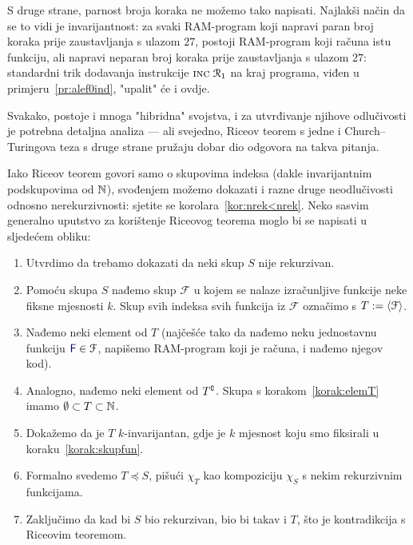 S druge strane, parnost broja koraka ne možemo tako napisati. Najlakši način da se to vidi je invarijantnost: za svaki RAM-program koji napravi paran broj koraka prije zaustavljanja s ulazom $27$, postoji RAM-program koji računa istu funkciju, ali napravi neparan broj koraka prije zaustavljanja s ulazom $27$: standardni trik dodavanja instrukcije $\textsc{inc}\;\mathcal R_{1}$ na kraj programa, viđen u primjeru~\ref{pr:alef0ind}, "upalit" će i ovdje.

Svakako, postoje i mnoga "hibridna" svojstva, i za utvrđivanje njihove odlučivosti je potrebna detaljna analiza --- ali svejedno, Riceov teorem s jedne i Church--\!Turingova teza s druge strane pružaju dobar dio odgovora na takva pitanja.

Iako Riceov teorem govori samo o skupovima indeksa (dakle invarijantnim podskupovima od ${\mathbb N}$), svođenjem možemo dokazati i razne druge neodlučivosti odnosno nerekurzivnosti: sjetite se korolara~\ref{kor:nrek<nrek}. Neko sasvim generalno uputstvo za korištenje Riceovog teorema moglo bi se napisati u sljedećem obliku:

\begin{enumerate}
    \item Utvrdimo da trebamo dokazati da neki skup $S$ nije rekurzivan.
    \item\label{korak:skupfun} Pomoću skupa $S$ nađemo skup $\mathcal F$ u kojem se nalaze izračunljive funkcije neke fiksne mjesnosti $k$.
    Skup svih indeksa svih funkcija iz $\mathcal F$ označimo s $T:=\langle\mathcal F\rangle$.
    \item\label{korak:elemT} Nađemo neki element od $T$ (najčešće tako da nađemo neku jednostavnu funkciju $\f F\in\mathcal F$, napišemo RAM-program koji je računa, i nađemo njegov kod).
    \item Analogno, nađemo neki element od $T\sp{{\scriptscriptstyle\complement}}$. Skupa s korakom~\ref{korak:elemT} imamo $\emptyset\subset T\subset{\mathbb N}$.
    \item Dokažemo da je $T$ $k$-invarijantan, gdje je $k$ mjesnost koju smo fiksirali u koraku~\ref{korak:skupfun}.
    \item Formalno svedemo $T\!\preceq S$, pišući $\chi_T$ kao kompoziciju $\chi_S$ s nekim rekurzivnim funkcijama.
    \item Zaključimo da kad bi $S$ bio rekurzivan, bio bi takav i $T$, što je kontradikcija s Riceovim teoremom.
\end{enumerate}

